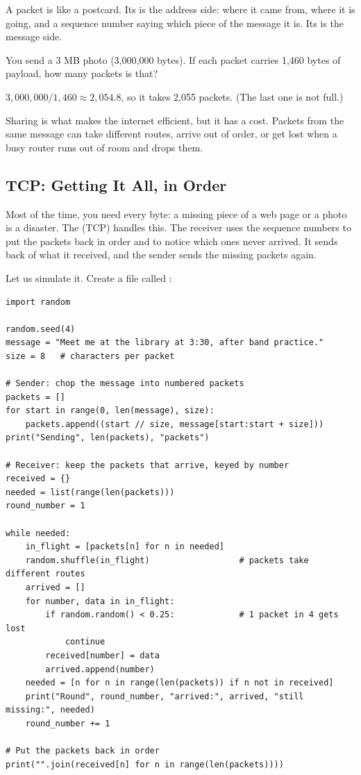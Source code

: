 A packet is like a postcard. Its  is the address side: where it came from, where it is
going, and a sequence number saying which piece of the message it is. Its  is the
message side.

\begin{Worked}
\begin{Problem}
You send a 3 MB photo (3,000,000 bytes). If each packet carries 1,460 bytes of
payload, how many packets is that?
\end{Problem}
\begin{Solution}
$3{,}000{,}000 / 1{,}460 \approx 2{,}054.8$, so it takes 2,055 packets. (The last one is
not full.)
\end{Solution}
\end{Worked}

Sharing is what makes the internet efficient, but it has a cost. Packets from the same message can take
different routes, arrive out of order, or get lost when a busy router runs out of room and drops them.

\subsection{TCP: Getting It All, in Order}
Most of the time, you need every byte: a missing piece of a web page or a photo is a disaster. The
 (TCP) handles this. The receiver uses the sequence numbers to put
the packets back in order and to notice which ones never arrived. It sends back
 of what it received, and the sender sends the missing packets again.

Let us simulate it. Create a file called :

\begin{verbatim}
import random

random.seed(4)
message = "Meet me at the library at 3:30, after band practice."
size = 8   # characters per packet

# Sender: chop the message into numbered packets
packets = []
for start in range(0, len(message), size):
    packets.append((start // size, message[start:start + size]))
print("Sending", len(packets), "packets")

# Receiver: keep the packets that arrive, keyed by number
received = {}
needed = list(range(len(packets)))
round_number = 1

while needed:
    in_flight = [packets[n] for n in needed]
    random.shuffle(in_flight)                  # packets take different routes
    arrived = []
    for number, data in in_flight:
        if random.random() < 0.25:             # 1 packet in 4 gets lost
            continue
        received[number] = data
        arrived.append(number)
    needed = [n for n in range(len(packets)) if n not in received]
    print("Round", round_number, "arrived:", arrived, "still missing:", needed)
    round_number += 1

# Put the packets back in order
print("".join(received[n] for n in range(len(packets))))
\end{verbatim}

